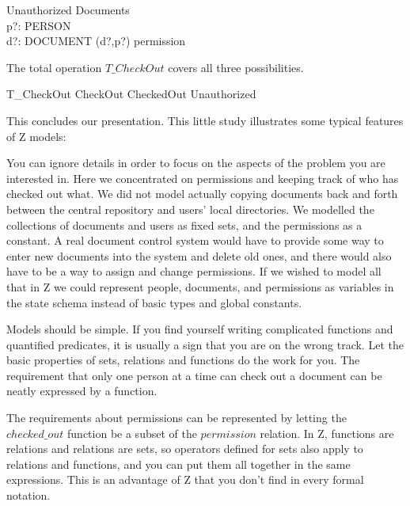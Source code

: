 \begin{schema}{Unauthorized}
	\Xi Documents \\
	p?: PERSON \\
 	d?: DOCUMENT
\where
	(d?,p?) \notin permission
\end{schema}
The total operation $T\_CheckOut$ covers all three possibilities.

\begin{zed}
	T\_CheckOut  CheckOut \lor CheckedOut \lor Unauthorized
\end{zed}
This concludes our presentation.  This little study illustrates some 
typical features of Z models:

You can ignore details in order to focus on the aspects of the problem
you are interested in.  Here we concentrated on permissions and
keeping track of who has checked out what.  We did not model actually
copying documents back and forth between the central repository and
users' local directories.  We modelled the collections of documents
and users as fixed sets, and the permissions as a constant.  A real
document control system would have to provide some way to enter new
documents into the system and delete old ones, and there would also
have to be a way to assign and change permissions.  If we wished to 
model all that in Z we could represent people, documents, and
permissions as variables in the state schema instead of basic types
and global constants.

Models should be simple.  If you find yourself writing complicated functions
and quantified predicates, it is usually a sign that you are on the wrong
track.  Let the basic properties of sets, relations and functions do the
work for you.  The requirement that only one person at a time can check out
a document can be neatly expressed by a function.

The requirements about permissions can be represented by letting the
$checked\_out$ function be a subset of the $permission$ relation.  In
Z, functions are relations and relations are sets, so operators
defined for sets also apply to relations and functions, and you can
put them all together in the same expressions.  This is an advantage
of Z that you don't find in every formal notation.
